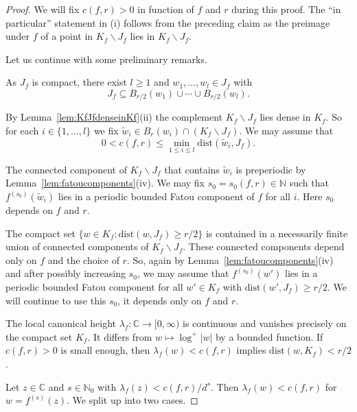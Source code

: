 \documentclass[12pt,oneside,a4]{amsart}
\newcommand{\IC}{\mathbb{C}}
\newcommand{\IN}{\mathbb{N}}
\numberwithin{maincounter}{section}
\numberwithin{equation}{section}
\renewcommand{\subset}{\subseteq}
\newcommand{\ssm}{\smallsetminus}
\begin{document}
\begin{proof}
  We will fix $c(f,r)>0$ in function of $f$ and $r$
  during this proof.
  The ``in particular'' statement in (i)
  follows from the preceding claim as the preimage under $f$ of a point
  in $K_f\ssm J_f$ lies in $K_f\ssm J_f$.

  Let us continue with some preliminary remarks.

  As $J_f$ is compact, there exist $l\ge 1$ and $w_1,\ldots,w_l\in J_f$ with 
  \begin{equation}
    \label{eq:Jfcover}
    J_f \subset  B_{r/2}(w_1)\cup\cdots\cup B_{r/2}(w_l).
  \end{equation}

  By Lemma~\ref{lem:KfJfdenseinKf}(ii) the complement $K_f\ssm J_f$ lies
  dense in $K_f$.
  So for each $i\in \{1,\ldots,l\}$ we fix $\tilde w_i \in
  B_{r}(w_i)\cap (K_f\ssm J_f)$. We may assume that
  \begin{equation}
    \label{eq:condctildew}
    0 < c(f,r) \le \min_{1\le i\le l} \mathrm{dist}(\tilde w_i,J_f). 
  \end{equation}
  
  The connected component of $K_f\ssm J_f$ that contains $\tilde w_i$
  is preperiodic by Lemma~\ref{lem:fatoucomponents}(iv). We may fix  
  $s_0=s_0(f,r)\in\IN$ such that $f^{(s_0)}(\tilde w_i)$ lies in a periodic
  bounded Fatou component of $f$ for all $i$. Here $s_0$ depends on $f$ and $r$.

  The compact set $\{w\in K_f : \mathrm{dist}(w,J_f)\ge r/2 \}$ is
  contained in a necessarily finite union of connected components of
  $K_f\ssm J_f$. These connected components depend only on $f$ and the
  choice of $r$. So, again by Lemma~\ref{lem:fatoucomponents}(iv)
  and 
  after possibly increasing $s_0$, we may assume that $f^{(s_0)}(w')$
  lies in a periodic bounded Fatou component for all $w'\in K_f$ with
  $\mathrm{dist}(w',J_f)\ge r/2$. We will continue to use this $s_0$, it
  depends only on $f$ and $r$.

  The local canonical height $\lambda_f\colon\IC\rightarrow[0,\infty)$
  is continuous and vanishes precisely on the compact set $K_f$. It
  differs from $w\mapsto \log^+|w|$ by a bounded function. If
  $c(f,r)>0$ is small enough, then $\lambda_f(w)<c(f,r)$
  implies $\mathrm{dist}(w,K_f)< r / 2$.

  Let $z\in \IC$ and $s\in\IN_0$ with $\lambda_f(z) < c(f,r)/d^s$.
  Then $\lambda_f(w)<c(f,r)$ for $w = f^{(s)}(z)$. We split up into two
  cases.


\end{proof}
\end{document}
